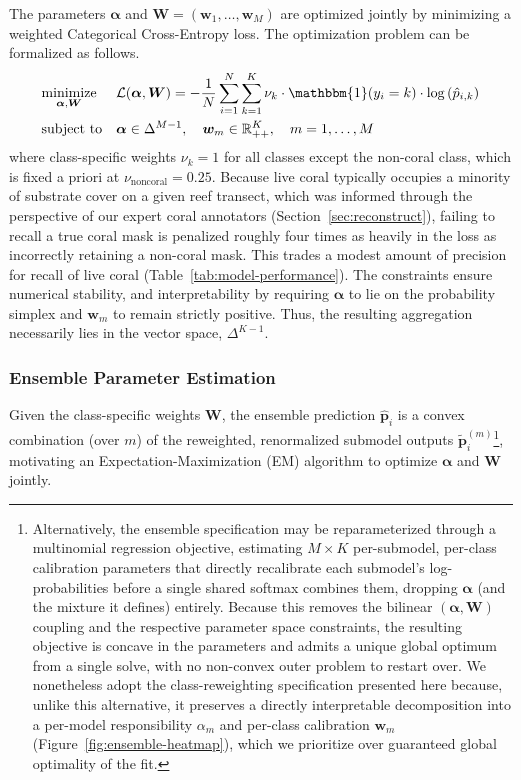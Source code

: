 \documentclass[11pt]{elsarticle}
\begin{document}
The parameters $\bm{\alpha}$ and $\bm{W} = (\bm{w}_1, \dots, \bm{w}_M)$ are optimized jointly by minimizing a weighted Categorical Cross-Entropy loss. The optimization problem can be formalized as follows.
\begin{equation} \label{eq:min_problem}
\begin{aligned}
& \underset{\bm{\alpha}, \bm{W}}{\text{minimize}}
& & \mathcal{L}(\bm{\alpha}, \bm{W}) = -\frac{1}{N} \sum_{i=1}^N \sum_{k=1}^K \nu_k \cdot \mathbbm{1}(y_i = k) \cdot \log\left( \hat{p}_{i,k} \right) \\
& \text{subject to}
& & \bm{\alpha} \in \Delta^{M-1}, \quad \bm{w}_m \in \mathbb{R}_{++}^K, \quad m = 1, \ldots, M
\end{aligned}
\end{equation}
where class-specific weights $\nu_k=1$ for all classes except the non-coral class, which is fixed a priori at $\nu_{\text{noncoral}} = 0.25$. Because live coral typically occupies a minority of substrate cover on a given reef transect, which was informed through the perspective of our expert coral annotators (Section~\ref{sec:reconstruct}), failing to recall a true coral mask is penalized roughly four times as heavily in the loss as incorrectly retaining a non-coral mask. This trades a modest amount of precision for recall of live coral (Table~\ref{tab:model-performance}). The constraints ensure numerical stability, and interpretability by requiring $\bm{\alpha}$ to lie on the probability simplex and $\bm{w}_m$ to remain strictly positive. Thus, the resulting aggregation necessarily lies in the vector space, $\Delta^{K-1}$.

\subsubsection{Ensemble Parameter Estimation}
Given the class-specific weights $\bm{W}$, the ensemble prediction $\hat{\bm{p}}_i$ is a convex combination (over $m$) of the reweighted, renormalized submodel outputs $\tilde{\bm{p}}_i^{(m)}$\footnote{Alternatively, the ensemble specification may be reparameterized through a multinomial regression objective, estimating $M \times K$ per-submodel, per-class calibration parameters that directly recalibrate each submodel's log-probabilities before a single shared softmax combines them, dropping $\bm{\alpha}$ (and the mixture it defines) entirely. Because this removes the bilinear $(\bm{\alpha}, \bm{W})$ coupling and the respective parameter space constraints, the resulting objective is concave in the parameters and admits a unique global optimum from a single solve, with no non-convex outer problem to restart over. We nonetheless adopt the class-reweighting specification presented here because, unlike this alternative, it preserves a directly interpretable decomposition into a per-model responsibility $\alpha_m$ and per-class calibration $\bm{w}_m$ (Figure~\ref{fig:ensemble-heatmap}), which we prioritize over guaranteed global optimality of the fit.}, motivating an Expectation-Maximization (EM) algorithm to optimize $\bm{\alpha}$ and $\bm{W}$ jointly.
\end{document}
